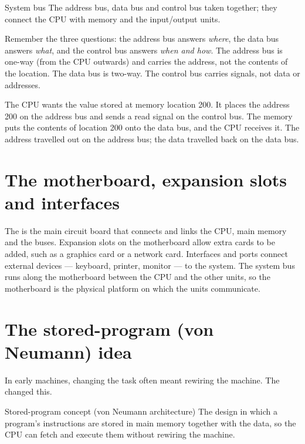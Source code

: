 \begin{definitionbox}{System bus}
The address bus, data bus and control bus taken together; they connect the
CPU with memory and the input/output units.
\end{definitionbox}

Remember the three questions: the address bus answers \emph{where}, the data
bus answers \emph{what}, and the control bus answers \emph{when and how}. The
address bus is one-way (from the CPU outwards) and carries the address, not
the contents of the location. The data bus is two-way. The control bus
carries signals, not data or addresses.

\begin{example}
The CPU wants the value stored at memory location 200. It places the address
200 on the address bus and sends a read signal on the control bus. The memory
puts the contents of location 200 onto the data bus, and the CPU receives it.
The address travelled out on the address bus; the data travelled back on the
data bus.
\end{example}

\section{The motherboard, expansion slots and interfaces}
The  is the main circuit board that connects and links the
CPU, main memory and the buses. Expansion slots on the motherboard allow
extra cards to be added, such as a graphics card or a network card. Interfaces
and ports connect external devices --- keyboard, printer, monitor --- to the
system. The system bus runs along the motherboard between the CPU and the
other units, so the motherboard is the physical platform on which the units
communicate.

\section{The stored-program (von Neumann) idea}
In early machines, changing the task often meant rewiring the machine. The
 changed this.

\begin{definitionbox}{Stored-program concept (von Neumann architecture)}
The design in which a program's instructions are stored in main memory
together with the data, so the CPU can fetch and execute them without
rewiring the machine.
\end{definitionbox}

